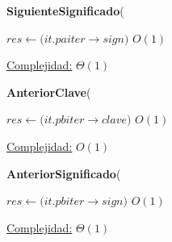 \begin{algorithm}[H]{\textbf{SiguienteSignificado}(}
	\begin{algorithmic}

		\State $res \gets (it.paiter$$\rightarrow$$sign) $ \Comment $O(1)$

		\medskip
		\Statex \underline{Complejidad:} $\Theta(1)$

    \end{algorithmic}
\end{algorithm}


\begin{algorithm}[H]{\textbf{AnteriorClave}(}
	\begin{algorithmic}

		\State $res \gets (it.pbiter$$\rightarrow$$clave) $ \Comment $O(1)$

		\medskip
		\Statex \underline{Complejidad:} $O(1)$

    \end{algorithmic}
\end{algorithm}


\begin{algorithm}[H]{\textbf{AnteriorSignificado}(}
	\begin{algorithmic}

		\State $res \gets (it.pbiter$$\rightarrow$$sign) $ \Comment $O(1)$

		\medskip
		\Statex \underline{Complejidad:} $\Theta(1)$

    \end{algorithmic}
\end{algorithm}


